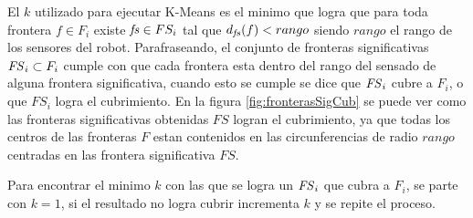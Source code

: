 El $k$ utilizado para ejecutar K-Means es el minimo que logra que para toda
frontera $f\in F_i$ existe $\mathit{fs} \in FS_i$ tal que $d_{\mathit{fs}}(f) <
rango$ siendo $rango$ el rango de los sensores del robot. Parafraseando, el
conjunto de fronteras significativas $\mathit{FS}_i \subset F_i$ cumple con que
cada frontera esta dentro del rango del sensado de alguna frontera
significativa, cuando esto se cumple se dice que $\mathit{FS}_i$ cubre a $F_i$, o
que $FS_i$ logra el cubrimiento. En la figura \ref{fig:fronterasSigCub} se
puede ver como las fronteras significativas obtenidas $FS$ logran el
cubrimiento, ya que todas los centros de las fronteras $F$ estan contenidos en
las circunferencias de radio $rango$ centradas en las frontera significativa
$FS$.

Para encontrar el minimo $k$ con las que se logra un $\mathit{FS}_i$ que cubra a
$F_i$, se parte con $k=1$, si el resultado no logra cubrir incrementa $k$ y se
repite el proceso.


